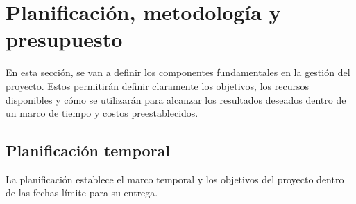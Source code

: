 \section{Planificación, metodología y presupuesto}

En esta sección, se van a definir los componentes fundamentales en la gestión del proyecto. Estos permitirán definir claramente los objetivos, los recursos disponibles y cómo se utilizarán para alcanzar los resultados deseados dentro de un marco de tiempo y costos preestablecidos.

\subsection{Planificación temporal}

La planificación establece el marco temporal y los objetivos del proyecto dentro de las fechas límite para su entrega.

\vline

